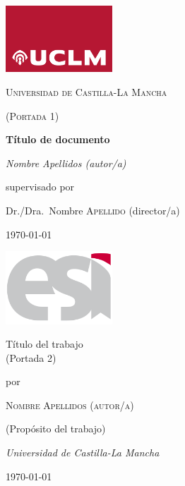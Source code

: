 \documentclass[12pt,a4paper]{report}
\begin{document}

\begin{titlepage}
	\centering
	\includegraphics[width=4cm]{uclm_logo}\par\vspace{1cm}
	{\scshape\LARGE Universidad de Castilla-La Mancha \par}
	\vspace{1cm}
	{\scshape\Large(Portada 1)\par} %
	\vspace{1.5cm}
	{\huge\bfseries Título de documento\par} %
	\vspace{2cm}
	{\Large\itshape Nombre Apellidos (autor/a)\par} %
	\vfill
	supervisado por\par
	Dr./Dra.~Nombre \textsc{Apellido} (director/a)
	\vfill %
	{\large \today \par}
\end{titlepage}

\begin{titlepage}
	\begin{addmargin}[4cm]{-1cm} %
		\centering
		\hfill\includegraphics[width=4cm]{esi_logo}\par
		\vspace{4\baselineskip}
		{\Huge 
		Título del trabajo\\ 
        (Portada 2)\par}
		\vspace{4\baselineskip}
		por\par\vspace{\baselineskip}
		{\Large\textsc{Nombre Apellidos (autor/a)}\par}
		\vfill  %
		(Propósito del trabajo)\par
		{\itshape Universidad de Castilla-La Mancha\par
        \today}
	\end{addmargin}
\end{titlepage}
\end{document}
